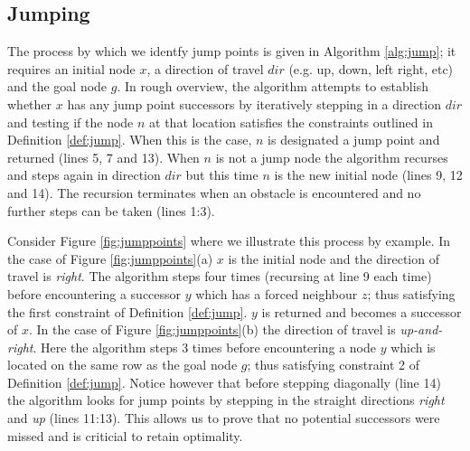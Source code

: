 

\subsection{Jumping}
The process by which we identfy jump points is given in Algorithm
\ref{alg:jump}; it requires an initial node $x$, a direction of travel $dir$
(e.g. up, down, left right, etc) and the goal node $g$.
In rough overview, the algorithm attempts to establish whether $x$ has any 
jump point successors by iteratively stepping in a direction $dir$ and testing
if the node $n$ at that location satisfies the constraints outlined in 
Definition \ref{def:jump}.
When this is the case, $n$ is designated a jump point and returned (lines 5, 7
and 13).
When $n$ is not a jump node the algorithm recurses and steps again in direction
$dir$ but this time $n$ is the new initial node (lines 9, 12 and 14).
The recursion terminates when an obstacle is encountered and no further
steps can be taken (lines 1:3).
\par
Consider Figure \ref{fig:jumppoints} where we illustrate this process by
example.
In the case of Figure \ref{fig:jumppoints}(a) $x$ is the initial node and the
direction of travel is \emph{right}. The algorithm steps four times (recursing
at line 9 each time) before
encountering a successor $y$ which has a forced neighbour $z$; thus satisfying
the first constraint of Definition \ref{def:jump}. $y$ is returned and becomes
a successor of $x$.
In the case of Figure \ref{fig:jumppoints}(b) the direction of travel is
\emph{up-and-right}.
Here the algorithm steps 3 times before encountering a node $y$ which is
located on the same row as the goal node $g$; thus satisfying constraint 2 of
Definition \ref{def:jump}.
Notice however that before stepping diagonally (line 14) the algorithm 
looks for jump points by stepping in the straight directions \emph{right} and
\emph{up} (lines 11:13).
This allows us to prove that no potential successors were missed and is
criticial to retain optimality.



